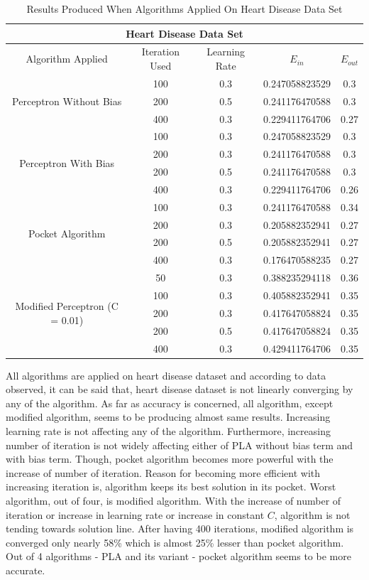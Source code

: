\documentclass{article}
\begin{document}
\begin{table}[H]

\begin{center}
\begin{tabular}{ |c|c|c|c|c| } 
\hline
\multicolumn{5}{|c|}{Heart Disease Data Set} \\
\hline
\hline
Algorithm Applied & Iteration Used & Learning Rate & \(E_{in}\) & \(E_{out}\) \\
\hline
\hline
\multirow{3}{5em}{Perceptron Without Bias} & 100 & 0.3 & 0.247058823529 & 0.3 \\ 
& 200 & 0.5 & 0.241176470588 & 0.3 \\ 
& 400 & 0.3 & 0.229411764706 & 0.27 \\ 
\hline
\hline
\multirow{4}{5em}{Perceptron With Bias} & 100 & 0.3 & 0.247058823529 & 0.3 \\ 
& 200 & 0.3 & 0.241176470588 & 0.3 \\ 
& 200 & 0.5 & 0.241176470588 & 0.3 \\ 
& 400 & 0.3 & 0.229411764706 & 0.26 \\ 
\hline
\hline
\multirow{4}{5em}{Pocket Algorithm} & 100 & 0.3 & 0.241176470588 & 0.34 \\ 
& 200 & 0.3 & 0.205882352941 & 0.27 \\ 
& 200 & 0.5 & 0.205882352941 & 0.27 \\ 
& 400 & 0.3 & 0.176470588235 & 0.27 \\ 
\hline
\hline
\multirow{5}{5em}{Modified Perceptron (C = 0.01)} & 50 & 0.3 & 0.388235294118 & 0.36 \\ 
& 100 & 0.3 & 0.405882352941 & 0.35 \\ 
& 200 & 0.3 & 0.417647058824 & 0.35 \\ 
& 200 & 0.5 & 0.417647058824 & 0.35 \\ 
& 400 & 0.3 & 0.429411764706 & 0.35 \\ 
\hline


\end{tabular}
\caption{Results Produced When Algorithms Applied On Heart Disease Data Set}
\end{center}
\end{table}
\par All algorithms are applied on heart disease dataset and according to data observed, it can be said that, heart disease dataset is not linearly converging by any of the algorithm. As far as accuracy is concerned, all algorithm, except modified algorithm, seems to be producing almost same results. Increasing learning rate is not affecting any of the algorithm. Furthermore, increasing number of iteration is not widely affecting either of PLA without bias term and with bias term. Though, pocket algorithm becomes more powerful with the increase of number of iteration. Reason for becoming more efficient with increasing iteration is, algorithm keeps its best solution in its pocket. Worst algorithm, out of four, is modified algorithm. With the increase of number of iteration or increase in learning rate or increase in constant \(C\), algorithm is not tending towards solution line. After having 400 iterations, modified algorithm is converged only nearly 58\% which is almost 25\% lesser than pocket algorithm. Out of 4 algorithms - PLA and its variant - pocket algorithm seems to be more accurate.  
\end{document}
